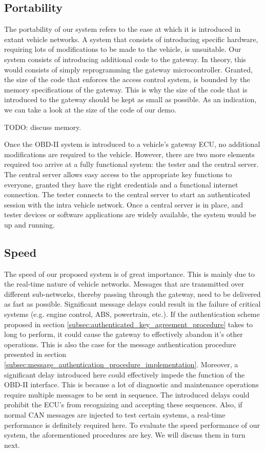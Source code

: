 \subsection{Portability}
\label{sec:portability}

The portability of our system refers to the ease at which it is introduced in extant vehicle networks. A system that consists of introducing specific hardware, requiring lots of modifications to be made to the vehicle, is unsuitable. Our system consists of introducing additional code to the gateway. In theory, this would consists of simply reprogramming the gateway microcontroller. Granted, the size of the code that enforces the access control system, is bounded by the memory specifications of the gateway. This is why the size of the code that is introduced to the gateway should be kept as small as possible. As an indication, we can take a look at the size of the code of our demo. 

TODO: discuss memory.

Once the OBD-II system is introduced to a vehicle's gateway ECU, no additional modifications are required to the vehicle. However, there are two more elements required too arrive at a fully functional system: the tester and the central server. The central server allows easy access to the appropriate key functions to everyone, granted they have the right credentials and a functional internet connection. The tester connects to the central server to start an authenticated session with the intra vehicle network. Once a central server is in place, and tester devices or software applications are widely available, the system would be up and running.

\subsection{Speed}
\label{sec:speed}

The speed of our proposed system is of great importance. This is mainly due to the real-time nature of vehicle networks. Messages that are transmitted over different sub-networks, thereby passing through the gateway, need to be delivered as fast as possible. Significant message delays could result in the failure of critical systems (e.g. engine control, ABS, powertrain, etc.). If the authentication scheme proposed in section \ref{subsec:authenticated_key_agreement_procedure} takes to long to perform, it could cause the gateway to effectively abandon it's other operations. This is also the case for the message authentication procedure presented in section \ref{subsec:message_authentication_procedure_implementation}. Moreover, a significant delay introduced here could effectively impede the function of the OBD-II interface. This is because a lot of diagnostic and maintenance operations require multiple messages to be sent in sequence. The introduced delays could prohibit the ECU's from recognizing and accepting these sequences. Also, if normal CAN messages are injected to test certain systems, a real-time performance is definitely required here. To evaluate the speed performance of our system, the aforementioned procedures are key. We will discuss them in turn next.

